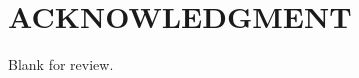 \documentclass[letterpaper, 10 pt, conference]{ieeeconf}  %
\begin{document}










\section*{ACKNOWLEDGMENT}
Blank for review.






\end{document}
